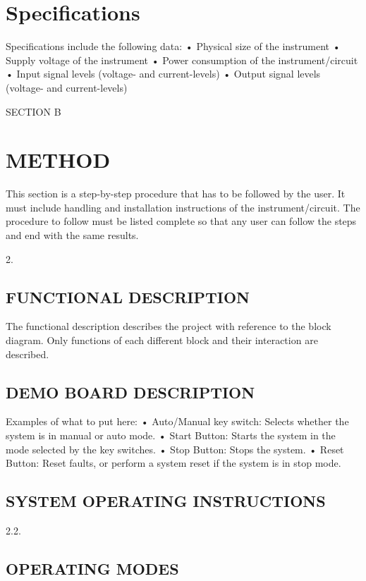 \documentclass[a4,12pt]{article}
\begin{document}
\section{Specifications}        

Specifications include the following data:
    • Physical size of the instrument
    • Supply voltage of the instrument
    • Power consumption of the instrument/circuit
    • Input signal levels (voltage- and current-levels)
    • Output signal levels (voltage- and current-levels)




SECTION B

\section{METHOD}        

This section is a step-by-step procedure that has to be followed by the user. It must include handling and installation instructions of the instrument/circuit.
The procedure to follow must be listed complete so that any user can follow the steps and end with the same results.

    2. 
    \subsection{FUNCTIONAL DESCRIPTION}        


The functional description describes the project with reference to the block diagram. Only functions of each different block and their interaction are described.


    \subsection{DEMO BOARD DESCRIPTION}        

Examples of what to put here:
    • Auto/Manual key switch: Selects whether the system is in manual or auto mode. 
    •   Start Button:	Starts the system in the mode selected by the key switches.
    • Stop Button:	Stops the system.
    • Reset Button:	Reset faults, or perform a system reset if the system is in stop mode.



\subsection{SYSTEM OPERATING INSTRUCTIONS}        
        2.2. 


\subsection{OPERATING MODES}        
\end{document}
